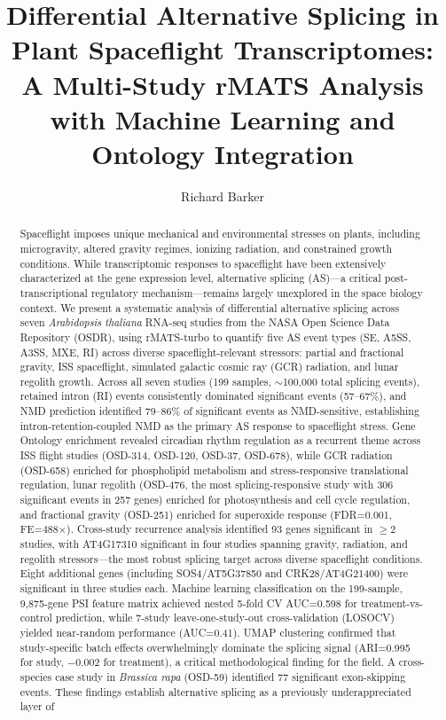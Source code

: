 \documentclass[12pt,a4paper]{article}
\title{Differential Alternative Splicing in Plant Spaceflight Transcriptomes: \\
A Multi-Study rMATS Analysis with Machine Learning and Ontology Integration}
\author{Richard Barker}
\date{}
\begin{document}
\maketitle

\noindent{}

\begin{abstract}
Spaceflight imposes unique mechanical and environmental stresses on plants, including microgravity, altered gravity regimes, ionizing radiation, and constrained growth conditions. While transcriptomic responses to spaceflight have been extensively characterized at the gene expression level, alternative splicing (AS)---a critical post-transcriptional regulatory mechanism---remains largely unexplored in the space biology context. We present a systematic analysis of differential alternative splicing across seven \textit{Arabidopsis thaliana} RNA-seq studies from the NASA Open Science Data Repository (OSDR), using rMATS-turbo to quantify five AS event types (SE, A5SS, A3SS, MXE, RI) across diverse spaceflight-relevant stressors: partial and fractional gravity, ISS spaceflight, simulated galactic cosmic ray (GCR) radiation, and lunar regolith growth. Across all seven studies (199 samples, $\sim$100,000 total splicing events), retained intron (RI) events consistently dominated significant events (57--67\%), and NMD prediction identified 79--86\% of significant events as NMD-sensitive, establishing intron-retention-coupled NMD as the primary AS response to spaceflight stress. Gene Ontology enrichment revealed circadian rhythm regulation as a recurrent theme across ISS flight studies (OSD-314, OSD-120, OSD-37, OSD-678), while GCR radiation (OSD-658) enriched for phospholipid metabolism and stress-responsive translational regulation, lunar regolith (OSD-476, the most splicing-responsive study with 306 significant events in 257 genes) enriched for photosynthesis and cell cycle regulation, and fractional gravity (OSD-251) enriched for superoxide response (FDR=0.001, FE=488$\times$). Cross-study recurrence analysis identified 93 genes significant in $\geq$2 studies, with AT4G17310 significant in four studies spanning gravity, radiation, and regolith stressors---the most robust splicing target across diverse spaceflight conditions. Eight additional genes (including SOS4/AT5G37850 and CRK28/AT4G21400) were significant in three studies each. Machine learning classification on the 199-sample, 9,875-gene PSI feature matrix achieved nested 5-fold CV AUC=0.598 for treatment-vs-control prediction, while 7-study leave-one-study-out cross-validation (LOSOCV) yielded near-random performance (AUC=0.41). UMAP clustering confirmed that study-specific batch effects overwhelmingly dominate the splicing signal (ARI=0.995 for study, $-$0.002 for treatment), a critical methodological finding for the field. A cross-species case study in \textit{Brassica rapa} (OSD-59) identified 77 significant exon-skipping events. These findings establish alternative splicing as a previously underappreciated layer of 
\end{abstract}
\end{document}
